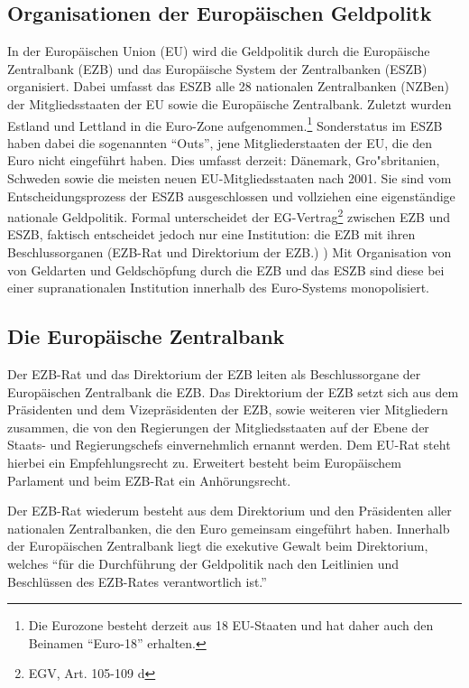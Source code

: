 \documentclass[
  onecolumn,
  a4paper,
  abstracton,
  parskip=half
  ,final
  ]{scrartcl}
\begin{document}
\subsection{Organisationen der Europ{\"a}ischen Geldpolitk}

In der Europ{\"a}ischen Union (EU) wird die Geldpolitik durch die Europ{\"a}ische Zentralbank (EZB) und das Europ{\"a}ische System der Zentralbanken (ESZB) organisiert. Dabei umfasst das ESZB alle 28 nationalen Zentralbanken (NZBen) der Mitgliedsstaaten der EU sowie die Europ{\"a}ische Zentralbank. Zuletzt wurden Estland und Lettland in die Euro-Zone aufgenommen.\footnote[98]{Die Eurozone besteht derzeit aus 18 EU-Staaten und hat daher auch den Beinamen  "`Euro-18"' erhalten.} Sonderstatus im ESZB haben dabei die sogenannten "`Outs"', jene Mitgliederstaaten der EU, die den Euro nicht eingef{\"u}hrt haben.
Dies umfasst derzeit: D{\"a}nemark, Gro{"s}britanien, Schweden sowie die meisten neuen EU-Mitgliedsstaaten nach 2001. Sie sind vom Entscheidungsprozess der ESZB ausgeschlossen und vollziehen eine eigenst{\"a}ndige nationale Geldpolitik.
Formal unterscheidet der EG-Vertrag\footnote[25]{EGV, Art. 105-109 d} zwischen EZB und ESZB, faktisch entscheidet jedoch nur eine Institution: die EZB mit ihren Beschlussorganen (EZB-Rat und Direktorium der EZB.) \citep[vgl.][S.553]{Basseler2010})
Mit Organisation von von Geldarten und Geldsch{\"o}pfung durch die EZB und das ESZB sind diese bei einer supranationalen Institution innerhalb des Euro-Systems monopolisiert.



\subsection{Die Europ{\"a}ische Zentralbank}

Der EZB-Rat und das Direktorium der EZB leiten als Beschlussorgane der Europ{\"a}ischen Zentralbank die EZB. Das Direktorium der EZB setzt sich aus dem Pr{\"a}sidenten und dem Vizepr{\"a}sidenten der EZB, sowie weiteren vier Mitgliedern zusammen, die von den Regierungen der Mitgliedsstaaten auf der Ebene der Staats- und Regierungschefs einvernehmlich ernannt werden. Dem EU-Rat steht hierbei ein Empfehlungsrecht zu. Erweitert besteht beim Europ{\"a}ischem Parlament und beim EZB-Rat ein Anh{\"o}rungsrecht. \citep[vgl.][S.553]{Basseler2010}

Der EZB-Rat wiederum besteht aus dem Direktorium und den Pr{\"a}sidenten aller nationalen Zentralbanken, die den Euro gemeinsam eingef{\"u}hrt haben. Innerhalb der Europ{\"a}ischen Zentralbank liegt die exekutive Gewalt beim Direktorium, welches "`f{\"u}r die Durchf{\"u}hrung der Geldpolitik nach den Leitlinien und Beschl{\"u}ssen des EZB-Rates verantwortlich ist."' \citep[S.553]{Basseler2010}
\end{document}

